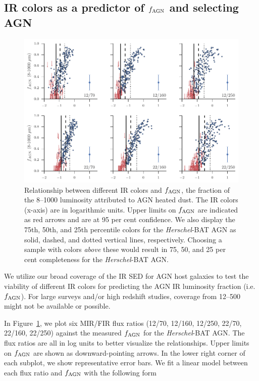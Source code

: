 \documentclass[fleqn, usenatbib]{mnras}
\newcommand{\herschel}{\emph{Herschel}}
\begin{document}
\subsection{IR colors as a predictor of $f_{\rm AGN}$ and selecting AGN}

\begin{figure}
\includegraphics[width=\textwidth]{figures/agnfrac_vs_flux_ratio}
\caption{Relationship between different IR colors and $f_{\rm AGN}$, the fraction of the 8--1000 \micron{} luminosity attributed to AGN heated dust. The IR colors (x-axis) are in logarithmic units. Upper limits on $f_{\rm AGN}$ are indicated as red arrows and are at 95 per cent confidence. We also display the 75th, 50th, and 25th percentile colors for the \herschel-BAT AGN as solid, dashed, and dotted vertical lines, respectively. Choosing a sample with colors \textit{above} these would result in 75, 50, and 25 per cent completeness for the \herschel-BAT AGN. \label{fig:agnfrac_vs_flux_ratio}}
\end{figure}

We utilize our broad coverage of the IR SED for AGN host galaxies to test the viability of different IR colors for predicting the AGN IR luminosity fraction (i.e. $f_{\rm AGN}$). For large surveys and/or high redshift studies, coverage from 12--500 \micron{} might not be available or possible.

In Figure~\ref{fig:agnfrac_vs_flux_ratio}, we plot six MIR/FIR flux ratios (12/70, 12/160, 12/250, 22/70, 22/160, 22/250) against the measured $f_{\rm AGN}$ for the \herschel-BAT AGN. The flux ratios are all in log units to better visualize the relationships. Upper limits on $f_{\rm AGN}$ are shown as downward-pointing arrows. In the lower right corner of each subplot, we show representative error bars. We fit a linear model between each flux ratio and $f_{\rm AGN}$ with the following form
\end{document}
